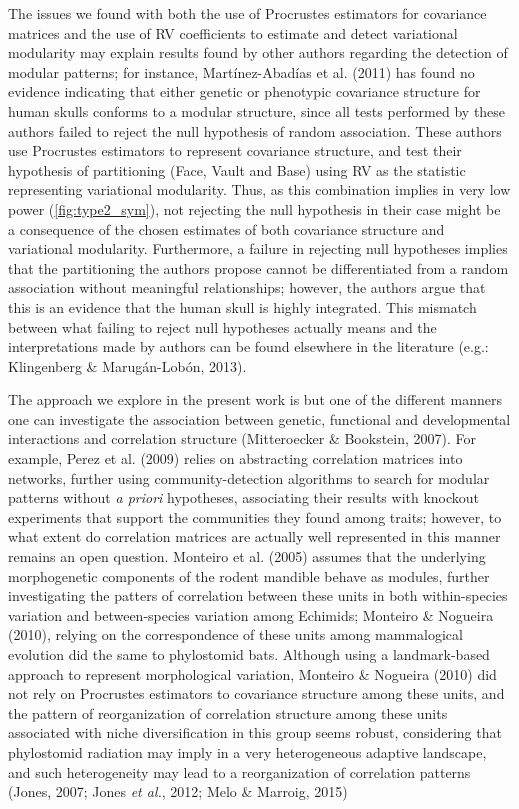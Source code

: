 \documentclass[12pt,]{article}
\begin{document}
The issues we found with both the use of Procrustes estimators for
covariance matrices and the use of RV coefficients to estimate and
detect variational modularity may explain results found by other authors
regarding the detection of modular patterns; for instance,
Martínez-Abadías et al. (2011) has found no evidence indicating that
either genetic or phenotypic covariance structure for human skulls
conforms to a modular structure, since all tests performed by these
authors failed to reject the null hypothesis of random association.
These authors use Procrustes estimators to represent covariance
structure, and test their hypothesis of partitioning (Face, Vault and
Base) using RV as the statistic representing variational modularity.
Thus, as this combination implies in very low power
(\autoref{fig:type2_sym}), not rejecting the null hypothesis in their
case might be a consequence of the chosen estimates of both covariance
structure and variational modularity. Furthermore, a failure in
rejecting null hypotheses implies that the partitioning the authors
propose cannot be differentiated from a random association without
meaningful relationships; however, the authors argue that this is an
evidence that the human skull is highly integrated. This mismatch
between what failing to reject null hypotheses actually means and the
interpretations made by authors can be found elsewhere in the literature
(e.g.: Klingenberg \& Marugán-Lobón, 2013).

The approach we explore in the present work is but one of the different
manners one can investigate the association between genetic, functional
and developmental interactions and correlation structure (Mitteroecker
\& Bookstein, 2007). For example, Perez et al. (2009) relies on
abstracting correlation matrices into networks, further using
community-detection algorithms to search for modular patterns without
\emph{a priori} hypotheses, associating their results with knockout
experiments that support the communities they found among traits;
however, to what extent do correlation matrices are actually well
represented in this manner remains an open question. Monteiro et al.
(2005) assumes that the underlying morphogenetic components of the
rodent mandible behave as modules, further investigating the patters of
correlation between these units in both within-species variation and
between-species variation among Echimids; Monteiro \& Nogueira (2010),
relying on the correspondence of these units among mammalogical
evolution did the same to phylostomid bats. Although using a
landmark-based approach to represent morphological variation, Monteiro
\& Nogueira (2010) did not rely on Procrustes estimators to covariance
structure among these units, and the pattern of reorganization of
correlation structure among these units associated with niche
diversification in this group seems robust, considering that phylostomid
radiation may imply in a very heterogeneous adaptive landscape, and such
heterogeneity may lead to a reorganization of correlation patterns
(Jones, 2007; Jones \emph{et al.}, 2012; Melo \& Marroig, 2015)
\end{document}
